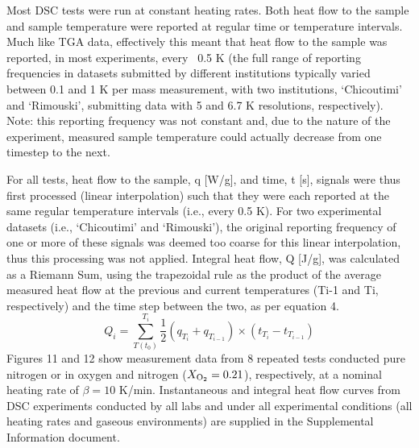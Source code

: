 \documentclass{book}
\begin{document}
Most DSC tests were run at constant heating rates. Both heat flow to the sample and sample temperature were reported at regular time or temperature intervals. Much like TGA data, effectively this meant that heat flow to the sample was reported, in most experiments, every ~0.5 K (the full range of reporting frequencies in datasets submitted by different institutions typically varied between 0.1 and 1 K per mass measurement, with two institutions, ‘Chicoutimi’ and ‘Rimouski’, submitting data with 5 and 6.7 K resolutions, respectively). Note: this reporting frequency was not constant and, due to the nature of the experiment, measured sample temperature could actually decrease from one timestep to the next.

For all tests, heat flow to the sample, q [W/g], and time, t [s], signals were thus first processed (linear interpolation) such that they were each reported at the same regular temperature intervals (i.e., every 0.5 K). For two experimental datasets (i.e., ‘Chicoutimi’ and ‘Rimouski’), the original reporting frequency of one or more of these signals was deemed too coarse for this linear interpolation, thus this processing was not applied. Integral heat flow, Q [J/g], was calculated as a Riemann Sum, using the trapezoidal rule as the product of the average measured heat flow at the previous and current temperatures (Ti-1 and Ti, respectively) and the time step between the two, as per equation 4.
\begin{equation}
Q_i=\sum_{T(t_0)}^{T_i}{\frac{1}{2}\left(q_{T_i}+q_{T_{i-1}}\right)\times\left(t_{T_i}-t_{T_{i-1}}\right)}
\end{equation}
Figures 11 and 12 show measurement data from 8 repeated tests conducted pure nitrogen or in oxygen and nitrogen ($X_{\rm O_2}=0.21$), respectively, at a nominal heating rate of $\beta=10$ K/min. Instantaneous and integral heat flow curves from DSC experiments conducted by all labs and under all experimental conditions (all heating rates and gaseous environments) are supplied in the Supplemental Information document.
\end{document}
